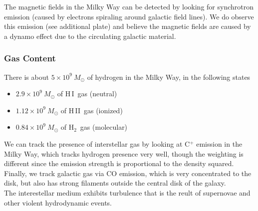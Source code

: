 \documentclass[10pt]{article}
\numberwithin{equation}{section}
\newcommand{\n}{\noindent}
\newcommand{\HI}{H\,I\ }
\newcommand{\HII}{H\,II\ }
\newcommand{\Htwo}{H$_2$\ }
\begin{document}
\n The magnetic fields in the Milky Way can be detected by looking for
synchrotron emission (caused by electrons spiraling around galactic field
lines). We do observe this emission (see additional plate) and believe the
magnetic fields are caused by a dynamo effect due to the circulating galactic
material.

\subsubsection{Gas Content} %
\label{ssub:gas_content}
There is about $5\times 10^9\ M_\odot$ of hydrogen in the Milky Way, in the
following states
\begin{itemize}
  \item $2.9\times 10^9\ M_\odot$ of \HI gas (neutral)
  \item $1.12\times 10^9\ M_\odot$ of \HII gas (ionized)
  \item $0.84\times 10^9\ M_\odot$ of \Htwo gas (molecular)
\end{itemize}
We can track the presence of interstellar gas by looking at C$^+$ emission in
the Milky Way, which tracks hydrogen presence very well, though the weighting
is different since the emission strength is proportional to the density
squared.\\

\n Finally, we track galactic gas via CO emission, which is very concentrated
to the disk, but also has strong filaments outside the central disk of the
galaxy.\\

\n The interestellar medium exhibits turbulence that is the reult of supernovae
and other violent hydrodynamic events.
\end{document}
